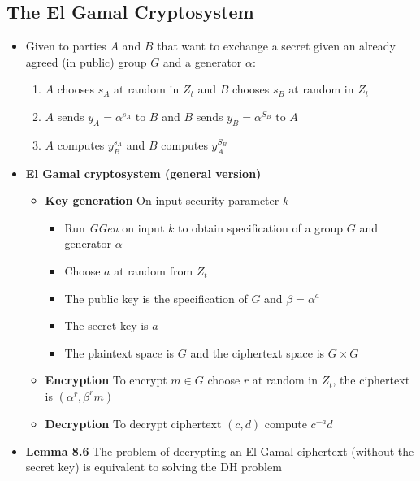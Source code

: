 \subsection{The El Gamal Cryptosystem}
\begin{itemize}
  \item Given to parties $A$ and $B$ that want to exchange a secret given an already agreed (in public) group $G$ and a generator $\alpha$:
  \begin{enumerate}
  	\item $A$ chooses $s_A$ at random in $Z_t$ and $B$ chooses $s_B$ at random in $Z_t$
  	\item $A$ sends $y_A = \alpha^{s_A}$ to $B$ and $B$ sends $y_B = \alpha^{S_B}$ to $A$
  	\item $A$ computes $y_B^{s_A}$ and $B$ computes $y_A^{S_B}$
  \end{enumerate}

  \item \textbf{El Gamal cryptosystem (general version)}
  \begin{itemize}
  	\item \textbf{Key generation} On input security parameter $k$
    \begin{itemize}
  		\item Run \textit{GGen} on input $k$ to obtain specification of a group $G$ and generator $\alpha$
  		\item Choose $a$ at random from $Z_t$
  		\item The public key is the specification of $G$ and $\beta = \alpha^a$
  		\item The secret key is $a$
  		\item The plaintext space is $G$ and the ciphertext space is $G \times G$
    \end{itemize}
  	\item \textbf{Encryption} To encrypt $m \in G$ choose $r$ at random in $Z_t$, the ciphertext is $(\alpha^r, \beta^rm)$
  	\item \textbf{Decryption} To decrypt ciphertext $(c,d)$ compute $c^{-a}d$
  \end{itemize}

  \item \textbf{Lemma 8.6} The problem of decrypting an El Gamal ciphertext (without the secret key) is equivalent to solving the DH problem


\end{itemize}
